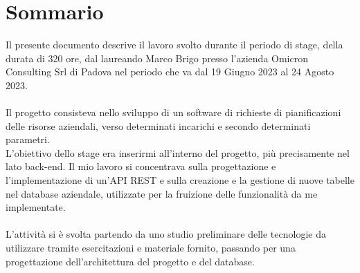 \cleardoublepage
{}
{}
\begingroup
\let\clearpage\relax
\let\cleardoublepage\relax
\let\cleardoublepage\relax

\chapter*{Sommario}

Il presente documento descrive il lavoro svolto durante il periodo di stage, della durata di 320 ore, dal laureando Marco Brigo presso l’azienda Omicron Consulting Srl di Padova nel periodo che va dal 19 Giugno 2023 al 24 Agosto 2023.\\\\
Il progetto consisteva nello sviluppo di un software di richieste di pianificazioni delle risorse aziendali, verso determinati incarichi e secondo determinati parametri.\\ L’obiettivo dello stage era inserirmi all’interno del progetto, più precisamente nel lato back-end.
Il mio lavoro si concentrava sulla progettazione e l'implementazione di un'API REST e sulla creazione e la gestione di nuove tabelle nel database aziendale, utilizzate per la fruizione delle funzionalità da me implementate. 
\\\\L’attività si è svolta partendo da uno studio preliminare delle tecnologie da utilizzare tramite esercitazioni e materiale fornito, passando per una progettazione dell’architettura del progetto e del database.





\endgroup

\vfill
